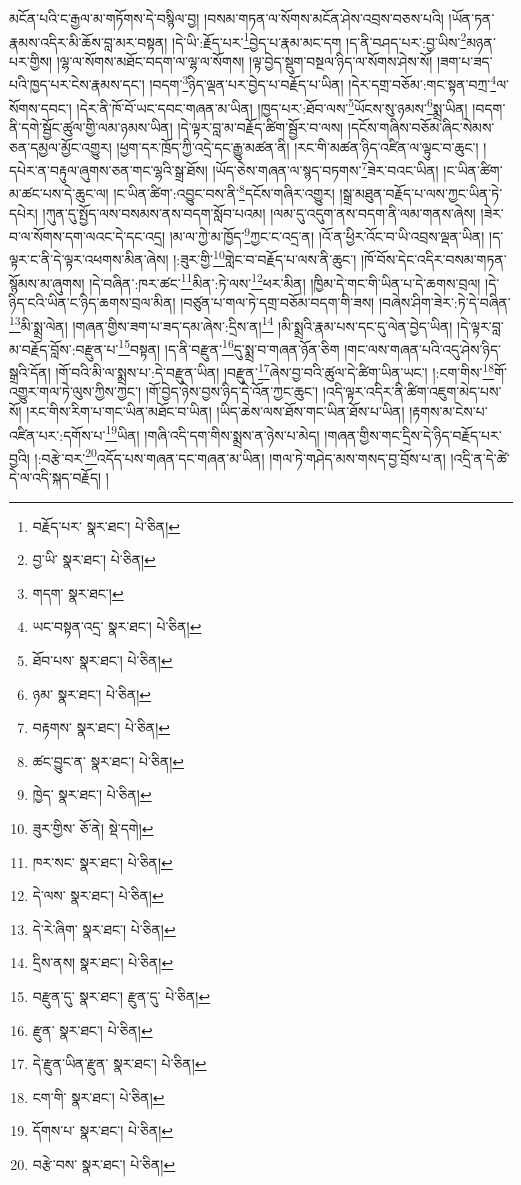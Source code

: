 མངོན་པའི་ང་རྒྱལ་མ་གཏོགས་དེ་བསྙིལ་བྱ། །བསམ་གཏན་ལ་སོགས་མངོན་ཤེས་འབྲས་བཅས་པའི། །ཡོན་ཏན་རྣམས་འདིར་མི་ཆོས་བླ་མར་བསྟན། །དེ་ཡི་:རྗོད་པར་\footnote{བརྗོད་པར་  སྣར་ཐང་།  པེ་ཅིན། }བྱེད་པ་རྣམ་མང་དག །ད་ནི་བཤད་པར་:བྱ་ཡིས་\footnote{བྱ་ཡི་  སྣར་ཐང་།  པེ་ཅིན། }མཉན་པར་གྱིས། །ལྷ་ལ་སོགས་མཐོང་བདག་ལ་ལྷ་ལ་སོགས། །ལྟ་བྱེད་སྡུག་བསྔལ་ཉིད་ལ་སོགས་ཤེས་སོ། །ཟག་པ་ཟད་པའི་ཁྱད་པར་ངེས་རྣམས་དང་། །བདག་\footnote{གདག་  སྣར་ཐང་། }ཉིད་ལྡན་པར་བྱེད་པ་བརྗོད་པ་ཡིན། །དེར་དགྲ་བཅོམ་:གང་སྟན་བཀྲ་\footnote{ཡང་བསྟན་འདྲ་  སྣར་ཐང་།  པེ་ཅིན། }ལ་སོགས་དབང་། །དེར་ནི་ཁོ་བོ་ཡང་དབང་གཞན་མ་ཡིན། །ཁྱད་པར་:ཐོབ་ལས་\footnote{ཐོབ་པས་  སྣར་ཐང་།  པེ་ཅིན། }ཡོངས་སུ་ཉམས་\footnote{ཉམ་  སྣར་ཐང་།  པེ་ཅིན། }སྨྲ་ཡིན། །བདག་ནི་དགེ་སྦྱོང་ཚུལ་གྱི་ལམ་ཉམས་ཡིན། །དེ་ལྟར་བླ་མ་བརྗོད་ཚིག་སྦྱོར་བ་ལས། །དངོས་གཞིས་བཅོམ་ཞིང་སེམས་ཅན་དམྱལ་མྱོང་འགྱུར། །ཕྱག་དར་ཁྲོད་ཀྱི་འདྲེ་དང་རྒྱུ་མཚན་ནི། །རང་གི་མཚན་ཉིད་འཛིན་ལ་ལྟུང་བ་ཆུང་། །དཔེར་ན་བརྟུལ་ཞུགས་ཅན་གང་ལྷའི་སྒྲ་ཐོས། །ཡོད་ཅེས་གཞན་ལ་སྙད་བཏགས་\footnote{བརྟགས་  སྣར་ཐང་།  པེ་ཅིན། }ཟེར་བའང་ཡིན། །ང་ཡིན་ཚིག་མ་ཚང་པས་དེ་ཆུང་ལ། །ང་ཡིན་ཚིག་:འབྱུང་བས་ནི་\footnote{ཚང་བྱུང་ན་  སྣར་ཐང་།  པེ་ཅིན། }དངོས་གཞིར་འགྱུར། །སྒྲ་མཐུན་བརྗོད་པ་ལས་ཀྱང་ཡིན་ཏེ་དཔེར། །ཀུན་དུ་སྤྱོད་ལས་བསམས་ནས་བདག་སློབ་པའམ། །ལམ་དུ་འདུག་ནས་བདག་ནི་ལམ་གནས་ཞེས། །ཟེར་བ་ལ་སོགས་དག་ལའང་དེ་དང་འདྲ། །མ་ལ་ཀྱེ་མ་ཁྱོད་\footnote{ཁྱེད་  སྣར་ཐང་།  པེ་ཅིན། }ཀྱང་ང་འདྲ་ན། །འོ་ན་ཕྱིར་འོང་བ་ཡི་འབྲས་ལྡན་ཡིན། །ད་ལྟར་ང་ནི་དེ་ལྟར་འཕགས་མིན་ཞེས། །:ཟུར་གྱི་\footnote{ཟུར་གྱིས་  ཅོ་ནེ།  སྡེ་དགེ། }གླེང་བ་བརྗོད་པ་ལས་ནི་ཆུང་། །ཁོ་བོས་དེང་འདིར་བསམ་གཏན་སྙོམས་མ་ཞུགས། །དེ་བཞིན་:ཁར་ཚང་\footnote{ཁར་སང་  སྣར་ཐང་།  པེ་ཅིན། }མིན་:ཏེ་ལས་\footnote{དེ་ལས་  སྣར་ཐང་།  པེ་ཅིན། }ཕར་མིན། །ཁྱིམ་དེ་གང་གི་ཡིན་པ་དེ་ཆགས་བྲལ། །དེ་ཉིད་ངའི་ཡིན་ང་ཉིད་ཆགས་བྲལ་མིན། །བཙུན་པ་གལ་ཏེ་དགྲ་བཅོམ་བདག་གི་ཟས། །བཞེས་ཤིག་ཟེར་:ཏེ་དེ་བཞིན་\footnote{དེ་རེ་ཞིག་  སྣར་ཐང་།  པེ་ཅིན། }མི་སྨྲ་ལེན། །གཞན་གྱིས་ཟག་པ་ཟད་དམ་ཞེས་:དྲིས་ན།\footnote{དྲིས་ནས།  སྣར་ཐང་།  པེ་ཅིན། } །མི་སྨྲའི་རྣམ་པས་དང་དུ་ལེན་བྱེད་ཡིན། །དེ་ལྟར་བླ་མ་བརྗོད་བློས་:བརྫུན་པ་\footnote{བརྫུན་དུ་  སྣར་ཐང་། རྫུན་དུ་  པེ་ཅིན། }བསྟན། །ད་ནི་བརྫུན་\footnote{རྫུན་  སྣར་ཐང་།  པེ་ཅིན། }དུ་སྨྲ་བ་གཞན་ཉོན་ཅིག །གང་ལས་གཞན་པའི་འདུ་ཤེས་ཉིད་སྒྲའི་དོན། །གོ་བའི་མི་ལ་སྨྲས་པ་:དེ་བརྫུན་ཡིན། །བརྫུན་\footnote{དེ་རྫུན་ཡིན་རྫུན་  སྣར་ཐང་།  པེ་ཅིན། }ཞེས་བྱ་བའི་ཚུལ་དེ་ཚིག་ཡིན་ཡང་། །:ངག་གིས་\footnote{ངག་གི་  སྣར་ཐང་།  པེ་ཅིན། }གོ་འགྱུར་གལ་ཏེ་ལུས་ཀྱིས་ཀྱང་། །གོ་བྱེད་ཉེས་བྱས་ཉིད་དེ་འོན་ཀྱང་ཆུང་། །འདི་ལྟར་འདིར་ནི་ཚིག་འཇུག་མེད་པས་སོ། །རང་གིས་རིག་པ་གང་ཡིན་མཐོང་བ་ཡིན། །ཡིད་ཆེས་ལས་ཐོས་གང་ཡིན་ཐོས་པ་ཡིན། །རྟགས་མ་ངེས་པ་འཛིན་པར་:དགོས་པ་\footnote{དོགས་པ་  སྣར་ཐང་།  པེ་ཅིན། }ཡིན། །གཞི་འདི་དག་གིས་སྨྲས་ན་ཉེས་པ་མེད། །གཞན་གྱིས་གང་དྲིས་དེ་ཉིད་བརྗོད་པར་བྱའི། །:བརྩེ་བར་\footnote{བརྩེ་བས་  སྣར་ཐང་།  པེ་ཅིན། }འདོད་པས་གཞན་དང་གཞན་མ་ཡིན། །གལ་ཏེ་གཤེད་མས་གསད་བྱ་བྲོས་པ་ན། །འདྲི་ན་དེ་ཚེ་དེ་ལ་འདི་སྐད་བརྗོད། །
